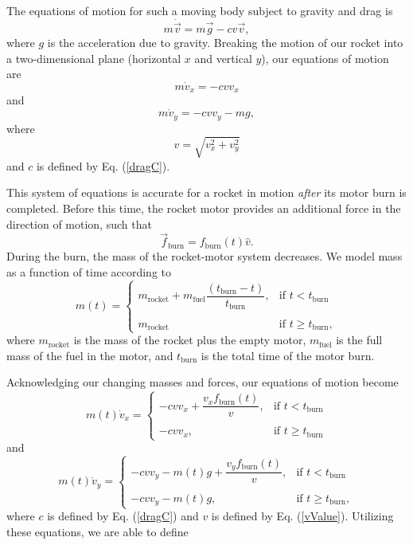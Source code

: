 \documentclass[aps,pra,twocolumn]{revtex4-1}
\begin{document}
The equations of motion for such a moving body subject to gravity and drag is \cite{taylor2005}
\begin{equation}
m \dot{\vec{v}} = m \vec{g} - c v \vec{v}, \label{dragC}
\end{equation}
where $g$ is the acceleration due to gravity.  Breaking the motion of our rocket into a two-dimensional plane (horizontal $x$ and vertical $y$), our equations of motion are
\begin{equation}
m \dot{v}_x  = -c v v_x \label{xafter}
\end{equation}
and
\begin{equation}
m \dot{v}_y  = -c v v_y - mg, \label{yafter}
\end{equation}
where
\begin{equation}
v = \sqrt{v_x^2 + v_y^2} \label{vValue}
\end{equation}
and $c$ is defined by Eq. (\ref{dragC}).

This system of equations is accurate for a rocket in motion \emph{after} its motor burn is completed.  Before this time, the rocket motor provides an additional force in the direction of motion, such that
\begin{equation}
\vec{f}_\text{burn} = f_\text{burn}(t) \hat{v}.
\end{equation}
During the burn, the mass of the rocket-motor system decreases.  We model mass as a function of time according to
\begin{equation}
m(t) = 
\begin{cases}
m_\text{rocket} + m_\text{fuel}\dfrac{(t_\text{burn} - t)}{t_\text{burn}}, & \text{if } t < t_\text{burn} \\ \\
m_\text{rocket} & \text{if } t \geq t_\text{burn},
\end{cases}
\end{equation}
where $m_\text{rocket}$ is the mass of the rocket plus the empty motor, $m_\text{fuel}$ is the full mass of the fuel in the motor, and $t_\text{burn}$ is the total time of the motor burn.

Acknowledging our changing masses and forces, our equations of motion become
\begin{equation}
m(t) \dot{v}_x = 
\begin{cases}
-c v v_x +  \dfrac{v_x f_\text{burn}(t)}{ v }, & \text{if } t < t_\text{burn} \\ \\
-c v v_x, & \text{if } t \geq t_\text{burn}
\label{xmotion}
\end{cases}
\end{equation}
and
\begin{equation}
m(t) \dot{v}_y = 
\begin{cases}
-c v v_y  - m(t) g+  \dfrac{v_y f_\text{burn}(t)}{ v }, & \text{if } t < t_\text{burn} \\ \\
-c v v_y - m(t) g, & \text{if } t \geq t_\text{burn},
\label{ymotion}
\end{cases}
\end{equation}
where $c$ is defined by Eq. (\ref{dragC}) and $v$ is defined by Eq. (\ref{vValue}).  Utilizing these equations, we are able to define 
\end{document}
